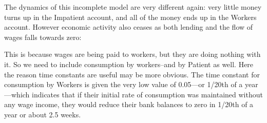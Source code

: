 The dynamics of this incomplete model are very different again: very
little money turns up in the Impatient account, and all of the money
ends up in the Workers account. However economic activity also ceases
as both lending and the flow of wages falls towards zero:
\begin{center}
\par\end{center}

This is because wages are being paid to workers, but they are doing
nothing with it. So we need to include consumption by workers--and
by Patient as well. Here the reason time constants are useful may
be more obvious. The time constant for consumption by Workers is given
the very low value of 0.05---or 1/20th of a year---which indicates
that if their initial rate of consumption was maintained without any
wage income, they would reduce their bank balances to zero in 1/20th
of a year or about 2.5 weeks. 
